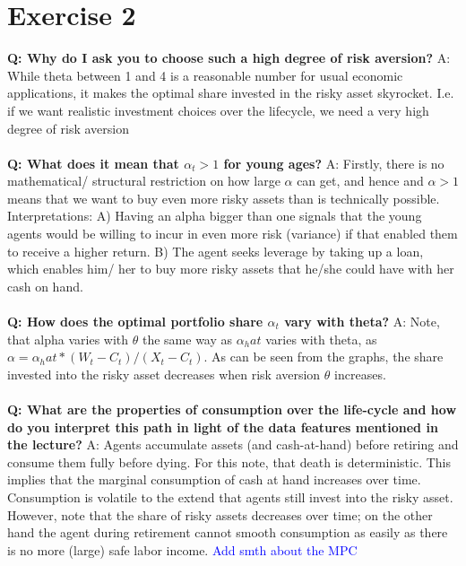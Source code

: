 \documentclass[12pt,a4paper]{article}
\begin{document}
\section*{Exercise 2}

\textbf{Q: Why do I ask you to choose such a high degree of risk aversion?}
A: While theta between 1 and 4 is a reasonable number for usual economic applications, it makes the optimal share invested in the risky asset skyrocket. I.e. if we want realistic investment choices over the lifecycle, we need a very high degree of risk aversion \\ \\

\textbf{Q: What does it mean that $\alpha_t > 1$ for young ages? }
A: Firstly, there is no mathematical/ structural restriction on how large $\alpha$ can get, and hence and $\alpha >1$ means that we want to buy even more risky assets than is technically possible. \\

Interpretations:
A) Having an alpha bigger than one signals that the young agents would be willing to incur in even more risk (variance) if that enabled them to receive a higher return. 
B) The agent seeks leverage by taking up a loan, which enables him/ her to buy more risky assets that he/she could have with her cash on hand. 
\\ \\

\textbf{Q: How does the optimal portfolio share $\alpha_t$ vary with theta? }
A: Note, that alpha varies with $\theta$ the same way as $\alpha_hat$ varies with theta, as $\alpha = \alpha_hat * (W_t - C_t)/ (X_t - C_t)$. As can be seen from the graphs, the share invested into the risky asset decreases when risk aversion $\theta$ increases. \\ \\

\textbf{Q: What are the properties of consumption over the life-cycle and how do you interpret this path in light of the data features mentioned in the lecture?}
A: Agents accumulate assets (and cash-at-hand) before retiring and consume them fully before dying. For this note, that death is deterministic. This implies that the marginal consumption of cash at hand increases over time. Consumption is volatile to the extend that agents still invest into the risky asset. However, note that the share of risky assets decreases over time; on the other hand the agent during retirement cannot smooth consumption as easily as there is no more (large) safe labor income. 
\textcolor{blue}{Add smth about the MPC}\\ \\
\end{document}
